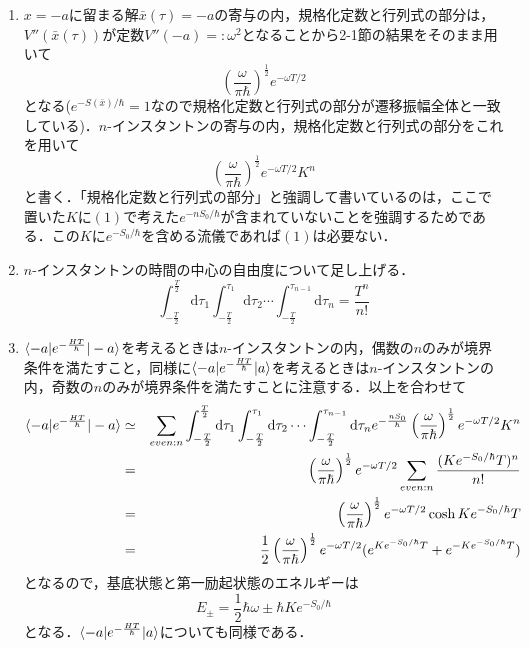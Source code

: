 \documentclass[a4paper,11pt]{jsarticle}
\begin{document}
\begin{enumerate}
\item $x=-a$に留まる解$\bar{x}(\tau)=-a$の寄与の内，規格化定数と行列式の部分は，$V''(\bar{x}(\tau))$が定数$V''(-a)=:\omega^2$となることから2-1節の結果をそのまま用いて
\begin{equation*}
\left(\frac{\omega}{\pi\hbar}\right)^{\frac{1}{2}} e^{-\omega T/2}
\end{equation*}
となる($e^{-S(\bar{x})/\hbar}=1$なので規格化定数と行列式の部分が遷移振幅全体と一致している)．$n$-インスタントンの寄与の内，規格化定数と行列式の部分をこれを用いて
\begin{equation*}
\left(\frac{\omega}{\pi\hbar}\right)^{\frac{1}{2}} e^{-\omega T/2}K^n
\end{equation*}
と書く．「規格化定数と行列式の部分」と強調して書いているのは，ここで置いた$K$に$(1)$で考えた$e^{-nS_0/\hbar}$が含まれていないことを強調するためである．この$K$に$e^{-S_0/\hbar}$を含める流儀であれば$(1)$は必要ない．
\item $n$-インスタントンの時間の中心の自由度について足し上げる．
\begin{equation*}
\int_{-\frac{T}{2}}^{\frac{T}{2}}\mathrm{d}\tau_1\int_{-\frac{T}{2}}^{\tau_1}\mathrm{d}\tau_2\cdots\int_{-\frac{T}{2}}^{\tau_{n-1}}\mathrm{d}\tau_n=\frac{T^n}{n!}
\end{equation*}
\item $\braket{-a|e^{-\frac{HT}{\hbar}}|-a}$を考えるときは$n$-インスタントンの内，偶数の$n$のみが境界条件を満たすこと，同様に$\braket{-a|e^{-\frac{HT}{\hbar}}|a}$を考えるときは$n$-インスタントンの内，奇数の$n$のみが境界条件を満たすことに注意する．以上を合わせて
\begin{eqnarray*}
\braket{-a|e^{-\frac{HT}{\hbar}}|-a}&\simeq&\sum_{even:n}\int_{-\frac{T}{2}}^{\frac{T}{2}}\mathrm{d}\tau_1\int_{-\frac{T}{2}}^{\tau_1}\mathrm{d}\tau_2\cdots\int_{-\frac{T}{2}}^{\tau_{n-1}}\mathrm{d}\tau_n
e^{-\frac{nS_0}{\hbar}}\left(\frac{\omega}{\pi\hbar}\right)^{\frac{1}{2}} e^{-\omega T/2}K^n \\
&=&\left(\frac{\omega}{\pi\hbar}\right)^{\frac{1}{2}}e^{-\omega T/2}\sum_{even:n}\frac{(Ke^{-S_0/\hbar}T)^n}{n!} \\
&=&\left(\frac{\omega}{\pi\hbar}\right)^{\frac{1}{2}}e^{-\omega T/2}\cosh{Ke^{-S_0/\hbar}T} \\
&=&\frac{1}{2}\left(\frac{\omega}{\pi\hbar}\right)^{\frac{1}{2}}e^{-\omega T/2}(e^{Ke^{-S_0/\hbar}T}+e^{-Ke^{-S_0/\hbar}T})
\end{eqnarray*}
となるので，基底状態と第一励起状態のエネルギーは
\begin{equation*}
E_\pm=\frac{1}{2}\hbar\omega \pm \hbar Ke^{-S_0/\hbar}
\end{equation*}
となる．$\braket{-a|e^{-\frac{HT}{\hbar}}|a}$についても同様である．
\end{enumerate}
\end{document}
